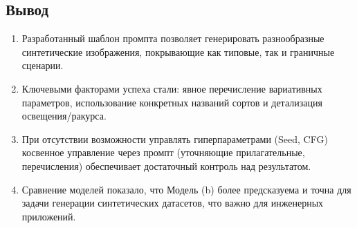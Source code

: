\subsection{Вывод}
\begin{enumerate}
	\item Разработанный шаблон промпта позволяет генерировать разнообразные синтетические изображения, покрывающие как типовые, так и граничные сценарии.
	\item Ключевыми факторами успеха стали: явное перечисление вариативных параметров, использование конкретных названий сортов и детализация освещения/ракурса.
	\item При отсутствии возможности управлять гиперпараметрами (Seed, CFG) косвенное управление через промпт (уточняющие прилагательные, перечисления) обеспечивает достаточный контроль над результатом.
	\item Сравнение моделей показало, что Модель (b) более предсказуема и точна для задачи генерации синтетических датасетов, что важно для инженерных приложений.
\end{enumerate}
